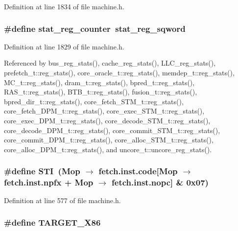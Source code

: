 Definition at line 1834 of file machine.h.
\subsubsection[{stat\_\-reg\_\-counter}]{\setlength{\rightskip}{0pt plus 5cm}\#define stat\_\-reg\_\-counter~stat\_\-reg\_\-sqword}\label{machine_8h_d5b220607569cd144bbc637326632a1d}




Definition at line 1829 of file machine.h.

Referenced by bus\_\-reg\_\-stats(), cache\_\-reg\_\-stats(), LLC\_\-reg\_\-stats(), prefetch\_\-t::reg\_\-stats(), core\_\-oracle\_\-t::reg\_\-stats(), memdep\_\-t::reg\_\-stats(), MC\_\-t::reg\_\-stats(), dram\_\-t::reg\_\-stats(), bpred\_\-t::reg\_\-stats(), RAS\_\-t::reg\_\-stats(), BTB\_\-t::reg\_\-stats(), fusion\_\-t::reg\_\-stats(), bpred\_\-dir\_\-t::reg\_\-stats(), core\_\-fetch\_\-STM\_\-t::reg\_\-stats(), core\_\-fetch\_\-DPM\_\-t::reg\_\-stats(), core\_\-exec\_\-STM\_\-t::reg\_\-stats(), core\_\-exec\_\-DPM\_\-t::reg\_\-stats(), core\_\-decode\_\-STM\_\-t::reg\_\-stats(), core\_\-decode\_\-DPM\_\-t::reg\_\-stats(), core\_\-commit\_\-STM\_\-t::reg\_\-stats(), core\_\-commit\_\-DPM\_\-t::reg\_\-stats(), core\_\-alloc\_\-STM\_\-t::reg\_\-stats(), core\_\-alloc\_\-DPM\_\-t::reg\_\-stats(), and uncore\_\-t::uncore\_\-reg\_\-stats().
\subsubsection[{STI}]{\setlength{\rightskip}{0pt plus 5cm}\#define STI~(Mop $\rightarrow$ fetch.inst.code[Mop $\rightarrow$ fetch.inst.npfx + Mop $\rightarrow$ fetch.inst.nopc] \& 0x07)}\label{machine_8h_1171212a040f76ad9630f030efb1653e}




Definition at line 577 of file machine.h.
\subsubsection[{TARGET\_\-X86}]{\setlength{\rightskip}{0pt plus 5cm}\#define TARGET\_\-X86}\label{machine_8h_384297c0c56dbc5d87b23537d3ffbf55}




